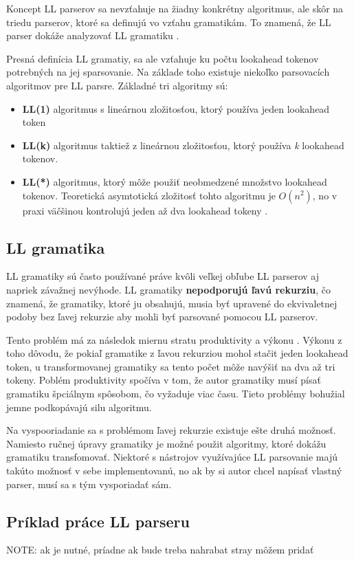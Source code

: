 Koncept LL parserov sa nevzťahuje na žiadny konkrétny algoritmus, ale skôr na triedu parserov, ktoré sa definujú vo vzťahu  gramatikám. To znamená, že LL parser dokáže analyzovať LL gramatiku \cite{haberman:hard_parsing}.

Presná definícia LL gramatiy, sa ale vzťahuje ku počtu lookahead tokenov potrebných na jej sparsovanie. Na základe toho existuje niekoľko parsovacích algoritmov pre LL parsre. Základné tri algoritmy sú:
\begin{itemize}
\item \textbf{LL(1)} algoritmus s lineárnou zložitosťou, ktorý používa jeden lookahead token 
\item \textbf{LL(k)} algoritmus taktiež z lineárnou zložitosťou, ktorý používa \textit{k} lookahead tokenov.
\item \textbf{LL(*)} algoritmus, ktorý môže použiť neobmedzené množstvo lookahead tokenov. Teoretická asymtotická zložitosť tohto algoritmu je $O(n^2)$, no v praxi väčšinou kontrolujú jeden až dva lookahead tokeny \cite{LL}.
\end{itemize}

\subsection{LL gramatika}\label{ll_grammar}
LL gramatiky sú často používané práve kvôli veľkej obľube LL parserov aj napriek závažnej nevýhode. LL gramatiky \textbf{nepodporujú ľavú rekurziu}, čo znamená, že gramatiky, ktoré ju obsahujú, musia byť upravené do ekvivaletnej podoby bez ľavej rekurzie aby mohli byť parsované pomocou LL parserov.

Tento problém má za následok miernu stratu produktivity a výkonu \cite{tomassetti:parsing}. Výkonu z toho dôvodu, že pokiaľ gramatike z ľavou rekurziou mohol stačit jeden lookahead token, u transformovanej gramatiky sa tento počet môže navýšiť na dva až tri tokeny. Poblém produktivity spočíva v tom, že autor gramatiky musí písať gramatiku špciálnym spôsobom, čo vyžaduje viac času. Tieto problémy bohužial jemne podkopávajú silu algoritmu.

Na vyspooriadanie sa s problémom ľavej rekurzie existuje ešte druhá možnosť. Namiesto ručnej úpravy gramatiky je možné použit algoritmy, ktoré dokážu gramatiku transfomovať. Niektoré s nástrojov využívajúce LL parsovanie majú takúto možnosť v sebe implementovanú, no ak by si autor chcel napísať vlastný parser, musí sa s tým vysporiadať sám.

\subsection{Príklad práce LL parseru}
NOTE: ak je nutné, príadne ak bude treba nahrabat stray môžem pridať

